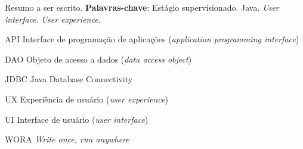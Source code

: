 \imprimircapa
\imprimirfolhaderosto*






\begin{resumo}
	Resumo a ser escrito.
	\textbf{Palavras-chave}: Estágio supervisionado. Java. \textit{User interface}. \textit{User experience}.
\end{resumo}




\begin{siglas}
  \item[API] Interface de programação de aplicações (\textit{application programming interface})
  \item[DAO] Objeto de acesso a dados (\textit{data access object})
  \item[JDBC] Java Database Connectivity
  \item[UX] Experiência de usuário (\textit{user experience})
	\item[UI] Interface de usuário (\textit{user interface})
  \item[WORA] \textit{Write once, run anywhere}
\end{siglas}

\tableofcontents*
\cleardoublepage
